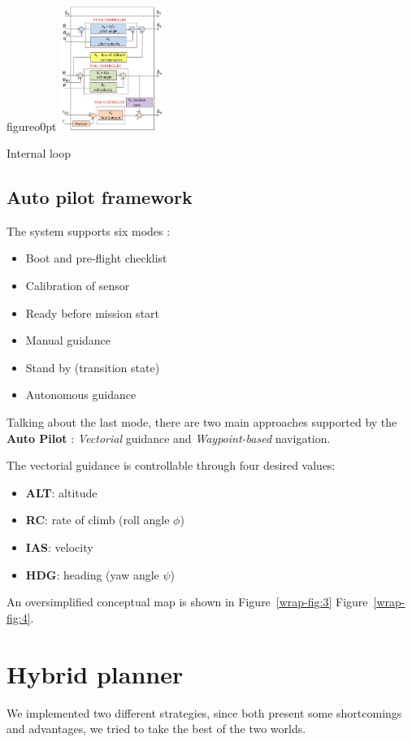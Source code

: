 \documentclass[oneside,onecolumn]{article}
\begin{document}
\begin{wrapfloat}{figure}{o}{0pt}
  \includegraphics[width=0.25\textwidth]{intLoop}
  \caption{Internal loop}\label{wrap-fig:4}
\end{wrapfloat} 


\subsection{Auto pilot framework}

The system supports six modes :
\begin{itemize}
\item Boot and pre-flight checklist
\item Calibration of sensor 
\item Ready before mission start
\item Manual guidance
\item Stand by (transition state)
\item Autonomous guidance
\end{itemize}

Talking about the last mode, there are two main approaches supported by the
\textbf{Auto Pilot} : \textit{Vectorial} guidance and \textit{Waypoint-based}
navigation.



The vectorial guidance is controllable through four desired values:
\begin{itemize}
\item \textbf{ALT}: altitude
\item \textbf{RC}: rate of climb (roll angle $\phi$)
\item \textbf{IAS}: velocity
\item \textbf{HDG}: heading (yaw angle $\psi$)
\end{itemize}
An oversimplified conceptual map is shown in Figure~\ref{wrap-fig:3} Figure~\ref{wrap-fig:4}.
\newpage
\section{Hybrid planner}
We implemented two different strategies, since both present some shortcomings
and advantages, we tried to take the best of the two worlds.
\end{document}
